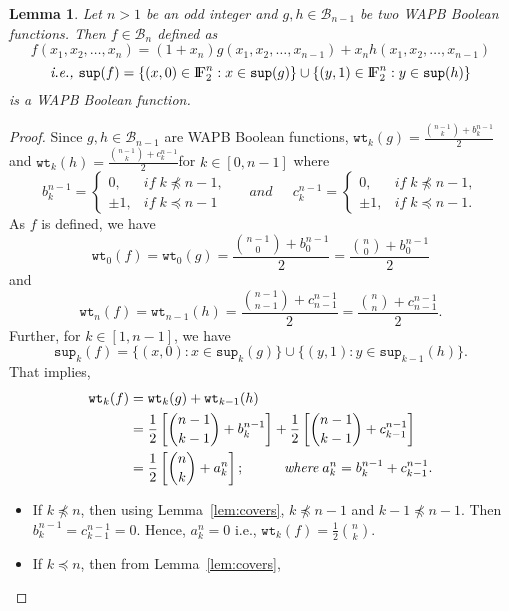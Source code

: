 \documentclass{article}[12pt]
\newtheorem{lemma}[theorem]{Lemma}
\newcommand{\FF}{{\rm I\!F}}
\newcommand{\CB}{\mathcal{B}}
\newcommand{\wt}{\mathtt{wt}}
\newcommand{\spt}{\mathtt{sup}}
\begin{document}
\begin{lemma}\label{lem:WAPB1}
Let $n > 1 $ be an odd integer and $g, h \in \CB_{n-1}$ be two WAPB Boolean functions. Then $f \in \CB_n$ defined as 
$$f(x_1, x_2, \ldots, x_n) = (1+x_n) g(x_1, x_2, \ldots, x_{n-1}) +  x_n h(x_1, x_2,  \ldots, x_{n-1})$$
$$\textit{i.e., } \spt(f) = \{(x,0) \in \FF_2^n : x \in \spt(g)\} \cup
	\{(y,1) \in \FF_2^n : y \in \spt(h)\}$$
is a WAPB Boolean function.
\end{lemma}
\begin{proof}
 Since $g, h \in \CB_{n-1}$ are WAPB Boolean functions, $\displaystyle{\wt_k(g)= \frac{{n-1 \choose k} + b_k^{n-1}}{2}}$ and $\displaystyle{\wt_k(h)= \frac{{n-1 \choose k} + c_k^{n-1}}{2}}$for $k \in [0,n-1]$ where
    $$b_k^{n-1} =
		\begin{cases}
		0 ,   & if \;  k \npreceq n-1, \\
		\pm 1,	& if \;  k \preceq n-1
		\end{cases} \; \; \; \; \textit{ and } \; \; \; \;
		c_k^{n-1} =
		\begin{cases}
		0 ,   & if \;  k \npreceq n-1, \\
		\pm 1,	& if \;  k \preceq n-1.
		\end{cases}$$
	As $f$ is defined, we have
	$$\wt_0(f) = \wt_0(g) = \frac{{n-1 \choose 0} + b_0^{n-1}}{2} = \frac{{n \choose 0} + b_0^{n-1}}{2}$$
	and $$\wt_n(f) = \wt_{n-1}(h) = \frac{{n-1 \choose n-1} + c_{n-1}^{n-1}}{2} = \frac{{n \choose n} + c_{n-1}^{n-1}}{2}.$$
	Further, for $k \in [1,n-1]$, we have
	$$\spt_k(f) = \{(x,0) : x \in \spt_k(g)\} \cup \{(y,1) : y \in \spt_{k-1}(h)\}.$$
That implies, 
\begin{align*}
\wt_k(f) & = \wt_k(g) + \wt_{k-1}(h) \\
    	& = \frac{1}{2}\left[ {{n-1} \choose {k-1}} + b_k^{n-1} \right] + \frac{1}{2}\left[ {{n-1} \choose {k-1}}+ c_{k-1}^{n-1} \right] \\
    	& = \frac{1}{2} \left[ {{n} \choose k } + a_k^{n}\right]  ;  \hspace{1.0cm} \textit{where} \; a_k^{n}= b_k^{n-1} + c_{k-1}^{n-1}.
\end{align*}
\begin{itemize}
    \item If $k \npreceq n$, then using Lemma~\ref{lem:covers}, $k \npreceq n-1$ and $k-1 \npreceq n-1$. Then $b_k^{n-1} = c_{k-1}^{n-1} = 0$. Hence, $a_k^{n} = 0$ i.e., $\wt_k(f)= \frac{1}{2}{n \choose k}$.
    \item If $k \preceq n$, then from Lemma~\ref{lem:covers}, 

\end{itemize}
\end{proof}
\end{document}
